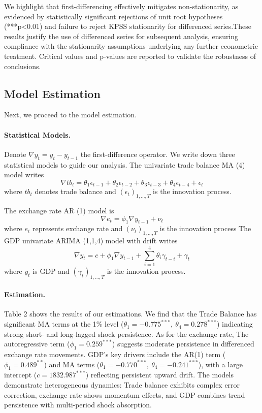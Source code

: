 \documentclass[
]{article}
\begin{document}
	We highlight that first-differencing effectively mitigates
	non-stationarity, as evidenced by statistically significant rejections of
	unit root hypotheses (***p<0.01) and failure to reject KPSS stationarity for 
	differenced series.These results justify the use of differenced series for subsequent analysis, 
	ensuring compliance with the stationarity assumptions underlying any further 
	econometric treatment. Critical values and p-values are reported to validate the robustness
	of conclusions.
	
	\subsection{Model Estimation}
	
	Next, we proceed to the model estimation.
	
	\paragraph*{Statistical Models.}
	
	Denote \( \nabla y_t = y_t - y_{t-1} \) the first-difference operator. We write
	down three statistical models to guide our analysis. The univariate trade balance MA (4) model writes
	\begin{equation}
		\nabla tb_t = \theta_1 \epsilon_{t-1} + \theta_2 \epsilon_{t-2} + \theta_3 \epsilon_{t-3} + \theta_4 \epsilon_{t-4} + \epsilon_t
	\end{equation}
	where \( tb_t \) denotes trade balance and $(\epsilon_t)_{1,..., T}$ is the innovation process.
	
	The exchange rate AR (1) model is 
	\begin{equation}
		\nabla e_t = \phi_1 \nabla y_{t-1} + \nu_t
	\end{equation}
	where \( e_t \) represents exchange rate and $(\nu_t)_{1,..., T}$ is the innovation process 
	The GDP univariate ARIMA (1,1,4) model with drift writes
	\begin{equation}
		\nabla y_t = c + \phi_1 \nabla y_{t-1} + \sum_{i=1}^4 \theta_i \gamma_{t-i} + \gamma_t
	\end{equation}
	where \( y_t \) is GDP and $(\gamma_t)_{1,..., T}$ is the innovation process.
	
	\paragraph*{Estimation.} Table 2 shows the results of our estimations. We find that the Trade Balance 
	has significant MA terms at the 1\% level (\( \theta_1 = -0.775^{***},\ \theta_4 = 0.278^{***} \)) 
	indicating strong short- and long-lagged shock persistence. As for the exchange rate,
	The autoregressive term (\( \phi_1 = 0.259^{***} \)) suggests moderate persistence 
	in differenced exchange rate movements. GDP's key drivers include the AR(1)
	term (\( \phi_1 = 0.489^{**} \)) and MA terms (\( \theta_1 = -0.770^{***},\ 
	\theta_4 = -0.241^{***} \)), with a large intercept (\( c = 1832.987^{***} \)) 
	reflecting persistent upward drift. The models
	demonstrate heterogeneous dynamics: Trade balance exhibits complex error correction, 
	exchange rate shows momentum effects, and GDP combines trend persistence with 
	multi-period shock absorption. 
	
\end{document}
